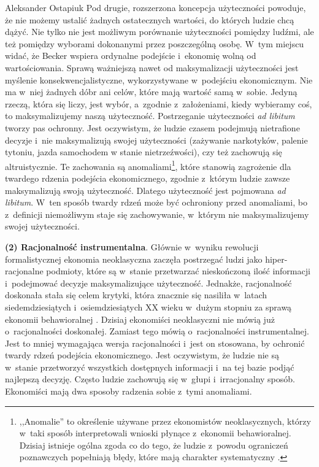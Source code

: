 \begin{artplenv}{Aleksander Ostapiuk}
Pod drugie, rozszerzona koncepcja użyteczności powoduje, że nie możemy ustalić żadnych ostatecznych wartości, do których
ludzie chcą dążyć. Nie tylko nie jest możliwym porównanie użyteczności pomiędzy ludźmi,
ale też pomiędzy wyborami dokonanymi przez poszczególną osobę. W~tym miejscu widać, że Becker
wspiera ordynalne podejście i~ekonomię wolną od wartościowania. Sprawą ważniejszą nawet od maksymalizacji użyteczności
jest myślenie konsekwencjalistyczne, wykorzystywane w~podejściu ekonomicznym. Nie ma w~niej żadnych dóbr ani celów, które
mają wartość samą w~sobie. Jedyną rzeczą, która się liczy, jest wybór, a~zgodnie z~założeniami, kiedy wybieramy coś, to
maksymalizujemy naszą użyteczność. Postrzeganie użyteczności \textit{ad libitum }tworzy pas ochronny. Jest
oczywistym, że ludzie czasem podejmują nietrafione decyzje i~nie maksymalizują swojej użyteczności (zażywanie
narkotyków, palenie tytoniu, jazda samochodem w stanie nietrzeźwości), czy też zachowują się altruistycznie. Te zachowania są
anomaliami\footnote{,,Anomalie'' to określenie używane przez ekonomistów neoklasycznych, którzy w~taki sposób interpretowali
wnioski płynące z~ekonomii behawioralnej. Dzisiaj istnieje ogólna zgoda co do tego, że ludzie z~powodu ograniczeń
poznawczych popełniają błędy, które mają charakter systematyczny
\parencite{thaler_misbehaving:_2015}.
}, które stanowią
zagrożenie dla twardego rdzenia podejścia ekonomicznego,
zgodnie z~którym ludzie zawsze maksymalizują swoją użyteczność. Dlatego użyteczność jest
pojmowana \textit{ad libitum}. W~ten sposób twardy rdzeń może być ochroniony przed anomaliami, bo z~definicji
niemożliwym staje się zachowywanie, w~którym nie maksymalizujemy swojej użyteczności. 

\textbf{(2) Racjonalność instrumentalna}. Głównie w~wyniku rewolucji formalistycznej ekonomia
neoklasyczna zaczęła postrzegać ludzi jako hiper-racjonalne podmioty, które są w~stanie przetwarzać nieskończoną
ilość informacji i~podejmować decyzje maksymalizujące użyteczność. Jednakże, racjonalność doskonała
stała się celem krytyki, która znacznie się nasiliła w~latach siedemdziesiątych i~osiemdziesiątych XX wieku w~dużym
stopniu za sprawą ekonomii behawioralnej
\parencite{thaler_misbehaving:_2015}.
Dzisiaj ekonomiści neoklasyczni nie
mówią już o~racjonalności doskonałej. Zamiast tego mówią o~racjonalności instrumentalnej. Jest to mniej wymagająca
wersja racjonalności i~jest on stosowana, by ochronić twardy rdzeń podejścia ekonomicznego. Jest oczywistym, że ludzie nie
są w~stanie przetworzyć wszystkich dostępnych informacji i~na tej bazie podjąć najlepszą decyzję. Często ludzie
zachowują się w~głupi i~irracjonalny sposób. Ekonomiści mają dwa sposoby radzenia sobie z~tymi anomaliami.


\end{artplenv}

